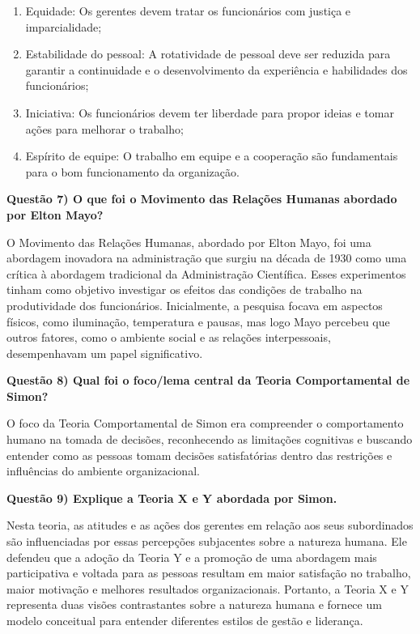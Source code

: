 \documentclass[11pt]{article}
\begin{document}
\begin{enumerate}
    \item Equidade: Os gerentes devem tratar os funcionários com justiça e imparcialidade;
    \item Estabilidade do pessoal: A rotatividade de pessoal deve ser reduzida para garantir a continuidade e o desenvolvimento da experiência e habilidades dos funcionários;
    \item Iniciativa: Os funcionários devem ter liberdade para propor ideias e tomar ações para melhorar o trabalho;
    \item Espírito de equipe: O trabalho em equipe e a cooperação são fundamentais para o bom funcionamento da organização.
\end{enumerate}

\noindent \textbf{Questão 7) O que foi o Movimento das Relações Humanas abordado por Elton Mayo?}\par
O Movimento das Relações Humanas, abordado por Elton Mayo, foi uma abordagem inovadora na administração que surgiu na década de 1930 como uma crítica à abordagem tradicional da Administração Científica. Esses experimentos tinham como objetivo investigar os efeitos das condições de trabalho na produtividade dos funcionários. Inicialmente, a pesquisa focava em aspectos físicos, como iluminação, temperatura e pausas, mas logo Mayo percebeu que outros fatores, como o ambiente social e as relações interpessoais, desempenhavam um papel significativo.\par

\noindent \textbf{Questão 8) Qual foi o foco/lema central da Teoria Comportamental de Simon?}\par
O foco da Teoria Comportamental de Simon era compreender o comportamento humano na tomada de decisões, reconhecendo as limitações cognitivas e buscando entender como as pessoas tomam decisões satisfatórias dentro das restrições e influências do ambiente organizacional.\par

\noindent \textbf{Questão 9) Explique a Teoria X e Y abordada por Simon.}\par
Nesta teoria, as atitudes e as ações dos gerentes em relação aos seus subordinados são influenciadas por essas percepções subjacentes sobre a natureza humana. Ele defendeu que a adoção da Teoria Y e a promoção de uma abordagem mais participativa e voltada para as pessoas resultam em maior satisfação no trabalho, maior motivação e melhores resultados organizacionais. Portanto, a Teoria X e Y representa duas visões contrastantes sobre a natureza humana e fornece um modelo conceitual para entender diferentes estilos de gestão e liderança.\par
\end{document}
